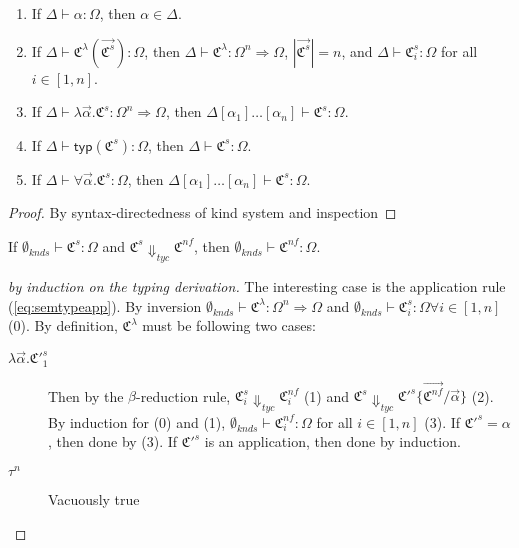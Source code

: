 \begin{lemma}[Inversion]
\begin{enumerate}
\item If $\Delta\vdash \alpha:\Omega$, then $\alpha \in \Delta$.
\item If $\Delta\vdash \mathfrak{C}^\lambda(\vec{\mathfrak{C}^s}) : \Omega$, then $\Delta\vdash \mathfrak{C}^\lambda:\Omega^n\Rightarrow\Omega$, $|\vec{\mathfrak{C}^s}|=n$, and $\Delta\vdash\mathfrak{C}^s_i:\Omega$ for all $i\in[1,n]$. 
\item If $\Delta\vdash\lambda\vec{\alpha}.\mathfrak{C}^s:\Omega^n\Rightarrow\Omega$, then $\Delta[\alpha_1]\ldots[\alpha_n]\vdash\mathfrak{C}^s:\Omega$.
\item If $\Delta\vdash\mathsf{typ}(\mathfrak{C}^s):\Omega$, then $\Delta\vdash \mathfrak{C}^s : \Omega$.
\item If $\Delta\vdash\forall\vec{\alpha}.\mathfrak{C}^s : \Omega$, then $\Delta[\alpha_1]\ldots[\alpha_n]\vdash \mathfrak{C}^s : \Omega$. 
\end{enumerate}
\end{lemma}
\begin{proof} By syntax-directedness of kind system and inspection
\end{proof}

\begin{lemma}
If $\emptyset_{knds}\vdash\mathfrak{C}^s:\Omega$ and $\mathfrak{C}^s \Downarrow_{tyc} \mathfrak{C}^{nf}$, then $\emptyset_{knds}\vdash\mathfrak{C}^{nf} : \Omega$. 
\end{lemma}
\begin{proof}[by induction on the typing derivation]
The interesting case is the application rule (\ref{eq:semtypeapp}). By inversion $\emptyset_{knds}\vdash\mathfrak{C}^\lambda : \Omega^n \Rightarrow \Omega$ and $\emptyset_{knds} \vdash \mathfrak{C}^s_i:\Omega\forall i\in[1,n]$ (0). By definition, $\mathfrak{C}^\lambda$ must be following two cases:
\begin{description}
\item[$\lambda\vec{\alpha}.\mathfrak{C'}^s_1$] Then by the $\beta$-reduction rule,  $\mathfrak{C}^s_i\Downarrow_{tyc} \mathfrak{C}^{nf}_i$ (1) and $\mathfrak{C}^s \Downarrow_{tyc} \mathfrak{C'}^s\{\vec{\mathfrak{C}^{nf}} /\vec{\alpha}\}$ (2). By induction for (0) and (1), $\emptyset_{knds}\vdash \mathfrak{C}^{nf}_i : \Omega$ for all $i\in[1,n]$ (3).  If $\mathfrak{C'}^s = \alpha$, then done by (3). If $\mathfrak{C'}^s$ is an application, then done by induction. 
\item[$\tau^n$] Vacuously true 
\end{description}
\end{proof}
 
